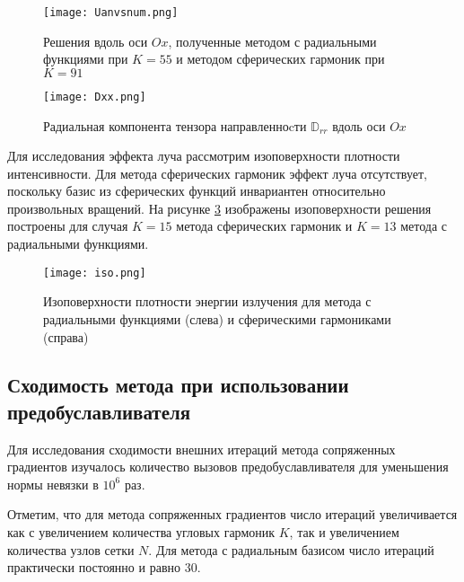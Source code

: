 \begin{figure}[ht!]
\centering
\texttt{[image: Uanvsnum.png]}
\caption{Решения вдоль оси $Ox$, полученные методом с радиальными функциями при $K=55$ и методом сферических гармоник при $K = 91$}
\label{fig:anvsnum}
\end{figure}

\begin{figure}[ht!]
\centering
\texttt{[image: Dxx.png]}
\caption{Радиальная компонента тензора направленноcти $\mathbb D_{rr}$ вдоль оси $Ox$}
\label{fig:Drad}
\end{figure}

Для исследования эффекта луча рассмотрим изоповерхности плотности интенсивности. Для метода сферических гармоник эффект луча отсутствует, поскольку базис из сферических функций инвариантен относительно произвольных вращений. На рисунке \ref{fig:iso} изображены изоповерхности решения построены для случая $K = 15$ метода сферических гармоник и $K = 13$ метода с радиальными функциями.

\begin{figure}[ht!]
\centering
\texttt{[image: iso.png]}
\caption{Изоповерхности плотности энергии излучения для метода с радиальными функциями (слева) и сферическими гармониками (справа)}
\label{fig:iso}
\end{figure}

\subsection{Сходимость метода при использовании предобуславливателя}

Для исследования сходимости внешних итераций метода сопряженных градиентов изучалось количество вызовов предобуславливателя для уменьшения нормы невязки в $10^{6}$ раз.

Отметим, что для метода сопряженных градиентов число итераций увеличивается как с увеличением количества угловых гармоник $K$, так и увеличением количества узлов сетки $N$. Для метода с радиальным базисом число итераций практически постоянно и равно $30$.

